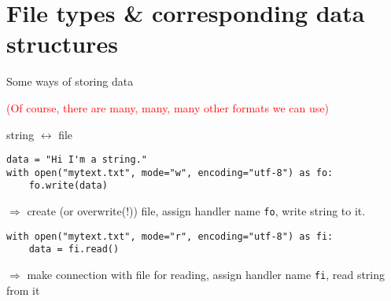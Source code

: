 \section[Files]{File types \& corresponding data structures}


\begin{frame}{Some ways of storing data}
\begin{table}[]
\end{table}
\pause
\textcolor{red}{\footnotesize{(Of course, there are many, many, many other formats we can use)}}
\end{frame}




\begin{frame}[fragile]{string $\leftrightarrow$ file}
\begin{lstlisting}
data = "Hi I'm a string."
with open("mytext.txt", mode="w", encoding="utf-8") as fo:
    fo.write(data)
\end{lstlisting}
$\Rightarrow$ create (or overwrite(!)) file, assign handler name \texttt{fo}, write string to it.

\pause 
\begin{lstlisting}
with open("mytext.txt", mode="r", encoding="utf-8") as fi:
    data = fi.read()
\end{lstlisting}

$\Rightarrow$ make connection with file for reading, assign handler name \texttt{fi}, read string from it

\end{frame}




